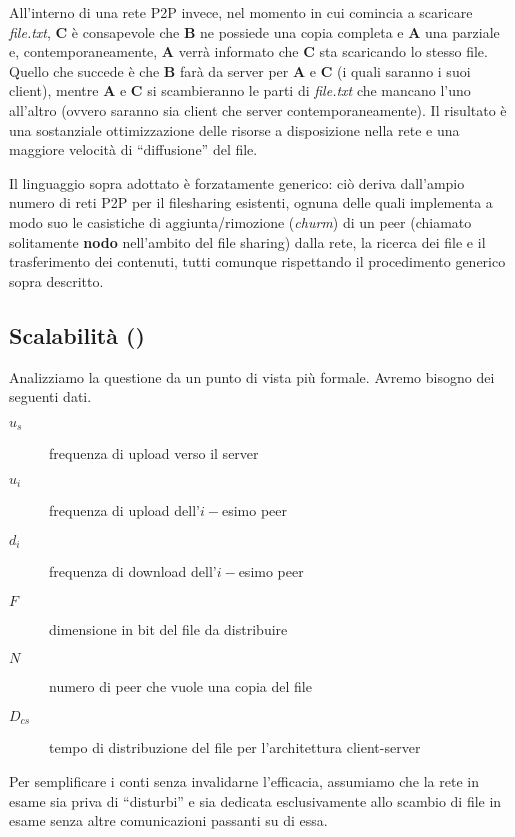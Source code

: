 All'interno di una rete P2P invece, nel momento in cui comincia a
scaricare \emph{file.txt}, \textbf{C} è consapevole che \textbf{B} ne
possiede una copia completa e \textbf{A} una parziale e,
contemporaneamente, \textbf{A} verrà informato che \textbf{C} sta
scaricando lo stesso file. Quello che succede è che \textbf{B} farà da
server per \textbf{A} e \textbf{C} (i quali saranno i suoi client),
mentre \textbf{A} e \textbf{C} si scambieranno le parti di
\emph{file.txt} che mancano l'uno all'altro (ovvero saranno sia client
che server contemporaneamente). Il risultato è una sostanziale
ottimizzazione delle risorse a disposizione nella rete e una maggiore
velocità di ``diffusione'' del file.

Il linguaggio sopra adottato è forzatamente generico: ciò deriva
dall'ampio numero di reti P2P per il filesharing esistenti, ognuna delle
quali implementa a modo suo le casistiche di aggiunta/rimozione
(\emph{churm}) di un peer (chiamato solitamente \textbf{nodo}
nell'ambito del file sharing) dalla rete, la ricerca dei file e il
trasferimento dei contenuti, tutti comunque rispettando il procedimento
generico sopra descritto.

\subsection{Scalabilità (\cite{kurose-ross})}\label{scalabilituxe0}

Analizziamo la questione da un punto di vista più formale. Avremo
bisogno dei seguenti dati.

\begin{description}
\item[$u_s$]
frequenza di upload verso il server
\item[$u_i$]
frequenza di upload dell'$i-$esimo peer
\item[$d_i$]
frequenza di download dell'$i-$esimo peer
\item[$F$]
dimensione in bit del file da distribuire
\item[$N$]
numero di peer che vuole una copia del file
\item[$D_{cs}$]
tempo di distribuzione del file per l'architettura client-server
\end{description}

Per semplificare i conti senza invalidarne l'efficacia, assumiamo che la
rete in esame sia priva di ``disturbi'' e sia dedicata esclusivamente
allo scambio di file in esame senza altre comunicazioni passanti su di
essa.

